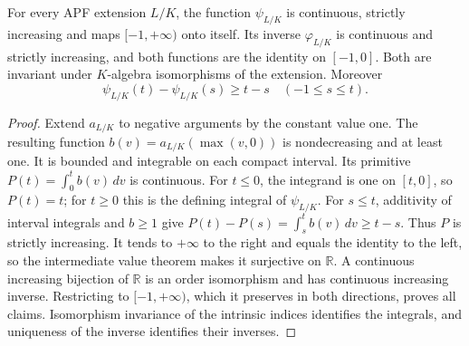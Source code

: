 \begin{proposition}
\label{fw:apf-herbrand-homeomorphism}
\leanok
For every APF extension $L/K$, the function $\psi_{L/K}$ is continuous,
strictly increasing and maps $[-1,+\infty)$ onto itself. Its inverse
$\varphi_{L/K}$ is continuous and strictly increasing, and both functions
are the identity on $[-1,0]$. Both are invariant under $K$-algebra
isomorphisms of the extension. Moreover
\[
 \psi_{L/K}(t)-\psi_{L/K}(s)\geq t-s
 \quad(-1\leq s\leq t).
\]
\end{proposition}
\begin{proof}
Extend $a_{L/K}$ to negative arguments by the constant value one. The
resulting function $b(v)=a_{L/K}(\max(v,0))$ is nondecreasing and at
least one. It is bounded and integrable on each compact interval.
Its primitive $P(t)=\int_0^t b(v)\,dv$ is continuous. For $t\leq0$,
the integrand is one on $[t,0]$, so $P(t)=t$; for $t\geq0$ this is
the defining integral of $\psi_{L/K}$. For $s\leq t$, additivity of
interval integrals and $b\geq1$ give
$P(t)-P(s)=\int_s^t b(v)\,dv\geq t-s$. Thus $P$ is strictly
increasing. It tends to $+\infty$ to the right and equals the identity
to the left, so the intermediate value theorem makes it surjective
on $\mathbb R$. A continuous increasing bijection of $\mathbb R$ is an
order isomorphism and has continuous increasing inverse. Restricting
to $[-1,+\infty)$, which it preserves in both directions, proves all
claims. Isomorphism invariance of the intrinsic indices identifies
the integrals, and uniqueness of the inverse identifies their inverses.
\end{proof}

